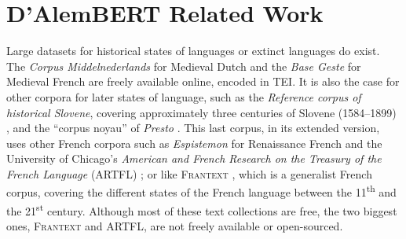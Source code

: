 
\section{D'AlemBERT Related Work}


Large datasets for historical states of languages or  extinct languages do exist. The \emph{Corpus Middelnederlands} for Medieval Dutch \citep{reenen-etal-1998-corpus} and the \emph{Base Geste} for Medieval French \citep{camps-etal-2019-geste} are freely available online, encoded in TEI. It is also the case for other corpora for later states of language, such as the \emph{Reference corpus of historical Slovene}, covering approximately three centuries of Slovene (1584--1899)  \citep{erjavec-2015-reference}, and the ``corpus noyau'' of \emph{Presto} \citep{blumenthal-2018-presto}. This last corpus, in its extended version, uses other French corpora such as \emph{Espistemon} for Renaissance French \citep{demonet-1998-epistemon} and the University of Chicago's \emph{American and French Research on the Treasury of the French Language} (ARTFL) \citep{morrissey-olsen-1991-american}; or like \textsc{Frantext} \citep{atilf-1998-frantext}, which is a generalist French corpus, covering the different states of the French language between the 11\textsuperscript{th} and the 21\textsuperscript{st} century. Although most of these text collections are free, the two biggest ones, \textsc{Frantext} and ARTFL, are not freely available or open-sourced.

